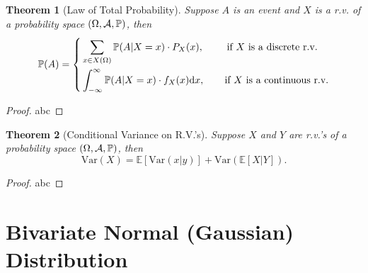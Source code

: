 \documentclass[openany,12pt]{book}
\newtheorem{theorem}{Theorem}[chapter]
\begin{document}
\begin{theorem}[Law of Total Probability]
Suppose $A$ is an event and $X$ is a r.v. of a probability space $(\Omega,\mathcal{A},\mathbb{P})$, then
\[\mathbb{P}(A) = \left\{ \begin{aligned}
&\sum_{x \in X(\Omega)}^{}{\mathbb{P}(A|X = x) \cdot P_{X}(x)},\qquad\ \mathrm{\text{if\ }}X\mathrm{\text{\ is\ a\ discrete\ r.v.}}\\
&\int_{- \infty}^{\infty} \mathbb{P}( A | X = x ) \cdot f_{X}( x )\dif x,\qquad\text{if\ }X\text{\ is\ a\ continuous\ r.v.} \\
\end{aligned} \right.\]
\end{theorem}

\begin{proof}
  abc
\end{proof}

\begin{theorem}[Conditional Variance on R.V.'s]
Suppose $X$ and $Y$ are r.v.'s of a probability space $(\Omega,\mathcal{A},\mathbb{P})$, then
\[\mathrm{Var}(X) = \mathbb{E}[\mathrm{Var}(x|y)] + \mathrm{Var}(\mathbb{E}[X | Y]).\]
\vspace{0.01cm}
\end{theorem}

\begin{proof}
  abc
\end{proof}

\section{Bivariate Normal (Gaussian) Distribution}
\end{document}
